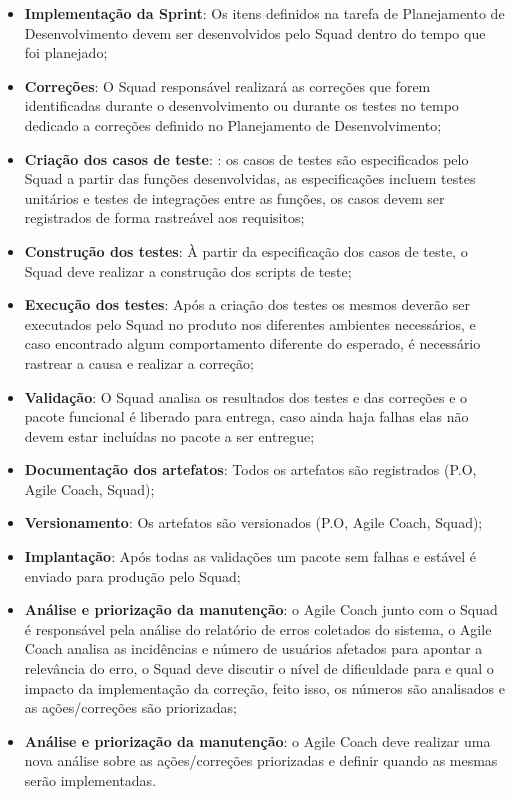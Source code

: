 \documentclass[	DIV=calc,%
							paper=a4,%
							fontsize=12pt,%
							onecolumn]{scrartcl}	 					%
\begin{document}
\begin{itemize}
	\item \textbf{Implementação da Sprint}: Os itens definidos na tarefa de Planejamento de Desenvolvimento devem ser desenvolvidos pelo Squad dentro do tempo que foi planejado;  
	
	\item \textbf{Correções}: O Squad responsável realizará as correções que forem identificadas durante o desenvolvimento ou durante os testes no tempo dedicado a correções definido no Planejamento de Desenvolvimento; 
	
	\item \textbf{Criação dos casos de teste}: : os casos de testes são especificados pelo Squad a partir das funções desenvolvidas, as especificações incluem testes unitários e testes de integrações entre as funções, os casos devem ser registrados de forma rastreável aos requisitos;
	
	\item \textbf{Construção dos testes}: À partir da especificação dos casos de teste, o Squad deve realizar a construção dos scripts de teste; 
	
	\item \textbf{Execução dos testes}:  Após a criação dos testes os mesmos deverão ser executados pelo Squad no produto nos diferentes ambientes necessários, e caso encontrado algum comportamento diferente do esperado, é necessário rastrear a causa e realizar a correção; 
	
	\item \textbf{Validação}: O Squad analisa os resultados dos testes e das correções e o pacote funcional é liberado para entrega, caso ainda haja falhas elas não devem estar incluídas no pacote a ser entregue; 
	
	\item \textbf{Documentação dos artefatos}: Todos os artefatos são registrados (P.O, Agile Coach, Squad); 
	
	\item \textbf{Versionamento}: Os artefatos são versionados (P.O, Agile Coach, Squad); 
	
	\item \textbf{Implantação}: Após todas as validações um pacote sem falhas e estável é enviado para produção pelo Squad;
	
	\item \textbf{Análise e priorização da manutenção}:  o Agile Coach junto com o Squad é responsável pela análise do relatório de erros coletados do sistema, o Agile Coach analisa as incidências e número de usuários afetados para apontar a relevância do erro, o Squad deve discutir o nível de dificuldade para e qual o impacto da implementação da correção, feito isso, os números são analisados e as ações/correções são priorizadas; 
	
	\item \textbf{Análise e priorização da manutenção}: o Agile Coach deve realizar uma nova análise sobre as ações/correções priorizadas e definir quando as mesmas serão implementadas. 
\end{itemize}
\end{document}
